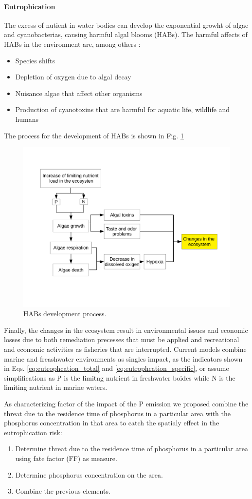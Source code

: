 \documentclass[10pt,a4paper]{article}
\begin{document}
\paragraph{Eutrophication}
The excess of nutient in water bodies can develop the exponential growht of algae and cyanobacterias, causing harmful algal blooms (HABs). The harmful affects of HABs in the environment are, among others \cite{Morelli}:
\begin{itemize}
	\item Species shifts
	\item Depletion of oxygen due to algal decay
	\item Nuisance algae that affect other organisms
	\item Production of cyanotoxins that are harmful for aquatic life, wildlife and humans
\end{itemize}

The process for the development of HABs is shown in Fig. \ref{fig:HABs}

\begin{figure}[H]
	\centering
	\includegraphics[width=0.6\linewidth, trim={2cm 4cm 1cm 2.5cm},clip]{HABs} 
	\caption{HABs development process.}
	\label{fig:HABs}
\end{figure}


Finally, the changes in the ecosystem result in environmental issues and economic losses due to both remediation precesses that must be applied and recreational and economic activities as fisheries that are interrupted.
Current models combine marine and freashwater environments as singles impact, as the indicators shown in Eqs. \ref{eq:eutrophcation_total} and \ref{eq:eutrophcation_specific}, or assume simplifications as P is the limitng nutrient in freshwater boides while N is the limiting nutrient in marine waters.

As characterizing factor of the impact of the P emission we proposed combine the threat due to the residence time of phosphorus in a particular area with the phosphorus concentration in that area to catch the spatialy effect in the eutrophication risk:
\begin{enumerate}
	\item Determine threat due to the residence time of phosphorus in a particular area using fate factor (FF) as measure.
	\item Determine phosphorus concentration on the area.
	\item Combine the previous elements.
\end{enumerate}
\end{document}
